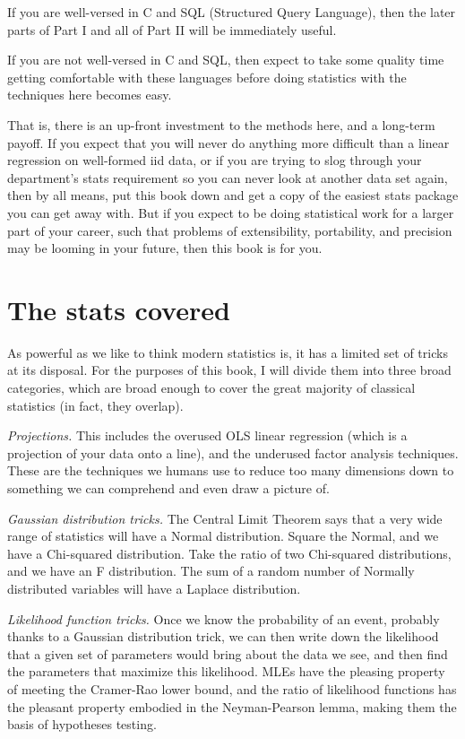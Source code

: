 \documentclass[12pt,notitlepage, openany]{book}
\def\ind#1{\index{#1}#1}
\begin{document}
If you are well-versed in C and SQL (Structured Query Language), then the later parts of Part I and
all of Part II will be immediately useful. 

If you are not well-versed in C and SQL, then expect to take some quality
time getting comfortable with these languages before doing statistics
with the techniques here becomes easy.

That is, there is an up-front investment to the methods here, and a
long-term payoff. If you expect that you will never do anything more
difficult than a linear regression on well-formed \ind{iid} data, or
if you are trying to slog through your department's stats requirement
so you can never look at another data set again, then by all means, put
this book down and get a copy of the easiest stats package you can get
away with. But if you expect to be doing statistical work for a larger
part of your career, such that problems of extensibility, portability,
and precision may be looming in your future, then this book is for you.


\section{The stats covered} 
As powerful as we like to think modern statistics is, it has a 
limited set of tricks at its disposal. For the purposes of this book,
I will divide them into three broad categories, which are broad enough
to cover the great majority of classical statistics (in fact, they overlap).

{\it Projections.} This includes the overused OLS linear regression (which is
a projection of your data onto a line), and the underused factor analysis
techniques. These are the techniques we humans use to reduce too many
dimensions down to something we can comprehend and even draw a picture of.

{\it Gaussian distribution tricks.} The Central Limit Theorem says that
a very wide range of statistics will have a Normal distribution. Square
the Normal, and we have a Chi-squared distribution. Take the ratio of two
Chi-squared distributions, and we have an F distribution.  The sum of
a random number of Normally distributed variables will have a Laplace
distribution.

{\it Likelihood function tricks.} Once we know the probability of an
event, probably thanks to a Gaussian distribution trick, we can then
write down the likelihood that a given set of parameters would bring
about the data we see, and then find the parameters that maximize this
likelihood. MLEs have the pleasing property of meeting the Cramer-Rao
lower bound, and the ratio of likelihood functions has the pleasant
property embodied in the Neyman-Pearson lemma, making them the basis of
hypotheses testing.
\end{document}
